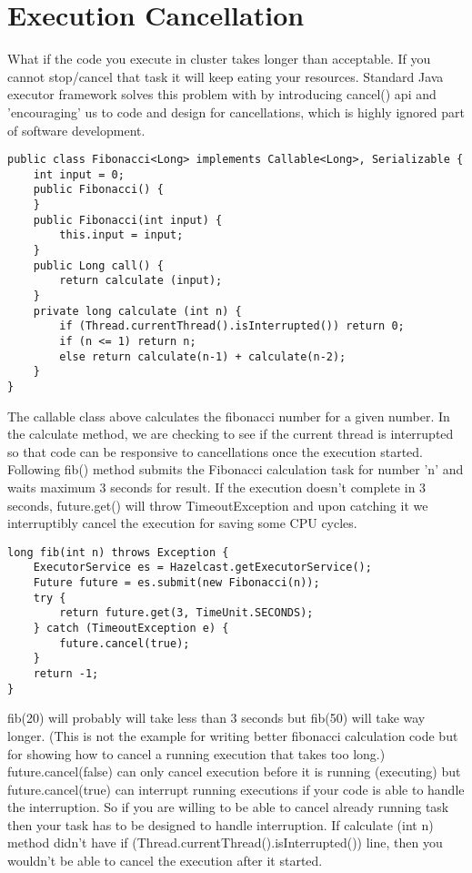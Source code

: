 \section{Execution Cancellation}

What if the code you execute in cluster takes longer than acceptable. If you cannot stop/cancel that task it will keep eating your resources. Standard Java executor framework solves this problem with by introducing cancel() api and 'encouraging' us to code and design for cancellations, which is highly ignored part of software development.

\begin{verbatim}
public class Fibonacci<Long> implements Callable<Long>, Serializable {
    int input = 0; 
    public Fibonacci() { 
    } 
    public Fibonacci(int input) { 
        this.input = input;
    } 
    public Long call() {
        return calculate (input);
    }
    private long calculate (int n) {
        if (Thread.currentThread().isInterrupted()) return 0;
        if (n <= 1) return n;
        else return calculate(n-1) + calculate(n-2);
    }
}
\end{verbatim}

The callable class above calculates the fibonacci number for a given number. In the calculate method, we are checking to see if the current thread is interrupted so that code can be responsive to cancellations once the execution started. Following fib() method submits the Fibonacci calculation task for number 'n' and waits maximum 3 seconds for result. If the execution doesn't complete in 3 seconds, future.get() will throw TimeoutException and upon catching it we interruptibly cancel the execution for saving some CPU cycles.

\begin{verbatim}
long fib(int n) throws Exception {
    ExecutorService es = Hazelcast.getExecutorService();
    Future future = es.submit(new Fibonacci(n));  
    try {
        return future.get(3, TimeUnit.SECONDS);
    } catch (TimeoutException e) {
        future.cancel(true);            
    }
    return -1;
}
\end{verbatim}
	
fib(20) will probably will take less than 3 seconds but fib(50) will take way longer. (This is not the example for writing better fibonacci calculation code but for showing how to cancel a running execution that takes too long.) future.cancel(false) can only cancel execution before it is running (executing) but future.cancel(true) can interrupt running executions if your code is able to handle the interruption. So if you are willing to be able to cancel already running task then your task has to be designed to handle interruption. If calculate (int n) method didn't have if (Thread.currentThread().isInterrupted()) line, then you wouldn't be able to cancel the execution after it started.

